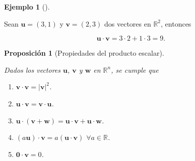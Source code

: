 \documentclass[
  a4paper,
]{scrreport}
\providecommand{\tightlist}{%
  \setlength{\itemsep}{0pt}\setlength{\parskip}{0pt}}\usepackage{longtable,booktabs,array}
\theoremstyle{definition}
\theoremstyle{definition}
\newtheorem{example}{Ejemplo}[chapter]
\theoremstyle{definition}
\theoremstyle{plain}
\theoremstyle{plain}
\theoremstyle{plain}
\newtheorem{proposition}{Proposición}[chapter]
\theoremstyle{remark}
\begin{document}
\begin{example}[]\protect\hypertarget{exm-producto-escalar}{}\label{exm-producto-escalar}

Sean \(\mathbf{u}=(3,1)\) y \(\mathbf{v}=(2,3)\) dos vectores en
\(\mathbb{R}^2\), entonces

\[
\mathbf{u}\cdot\mathbf{v} = 3\cdot 2 +1\cdot 3 = 9.
\]

\end{example}

\begin{proposition}[Propiedades del producto
escalar]\protect\hypertarget{prp-propiedades-producto-escalar}{}\label{prp-propiedades-producto-escalar}

Dados los vectores \(\mathbf{u}\), \(\mathbf{v}\) y \(\mathbf{w}\) en
\(\mathbb{R}^n\), se cumple que

\begin{enumerate}
\def\labelenumi{\alph{enumi}.}
\tightlist
\item
  \(\mathbf{v}\cdot\mathbf{v} = |\mathbf{v}|^2\).
\item
  \(\mathbf{u}\cdot\mathbf{v} = \mathbf{v}\cdot\mathbf{u}\).
\item
  \(\mathbf{u}\cdot(\mathbf{v}+\mathbf{w}) = \mathbf{u}\cdot\mathbf{v} + \mathbf{u}\cdot\mathbf{w}\).
\item
  \((a\mathbf{u})\cdot\mathbf{v} = a(\mathbf{u}\cdot\mathbf{v})\)
  \(\forall a\in\mathbb{R}\).
\item
  \(\mathbf{0} \cdot \mathbf{v} = 0\).
\end{enumerate}

\end{proposition}
\end{document}
